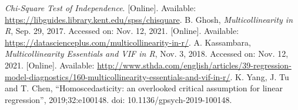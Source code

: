 \documentclass[a4paper]{article}
\begin{document}
\begin{thebibliography}{9}
     \emph{Chi-Square Test of Independence}. [Online]. Available: \url{https://libguides.library.kent.edu/spss/chisquare}. %
     B. Ghosh, \emph{Multicollinearity in R}, Sep. 29, 2017. Accessed on: Nov. 12, 2021. [Online]. Available: \href{https://datascienceplus.com/multicollinearity-in-r/}{https://datascienceplus.com/multicollinearity-in-r/}.
     A. Kassambara, \emph{Multicollinearity Essentials and VIF in R}, Nov. 3, 2018. Accessed on: Nov. 12, 2021. [Online]. Available: \href{http://www.sthda.com/english/articles/39-regression-model-diagnostics/160-multicollinearity-essentials-and-vif-in-r/}{http://www.sthda.com/english/articles/39-regression-model-diagnostics/160-multicollinearity-essentials-and-vif-in-r/}.
     K. Yang, J. Tu and T. Chen,  “Homoscedasticity: an overlooked critical assumption for linear regression”, 2019;32:e100148. doi: 10.1136/gpsych-2019-100148.




\end{thebibliography}

























\author{phat.tran.k19}
\end{document}
